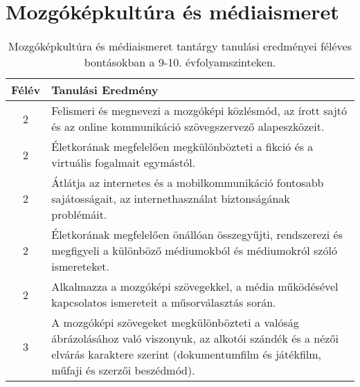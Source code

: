         \section{Mozgóképkultúra és médiaismeret}

       
           \begin{longtable}{c | p{} }
            \caption[Mozgóképkultúra és médiaismeret 9-10.]{Mozgóképkultúra és médiaismeret tantárgy tanulási eredményei féléves bontásokban a 9-10. évfolyamszinteken. }  \\

            \textbf{Félév} & \textbf{Tanulási Eredmény} \\
            \hline
            \endhead
                                
                                          2 &  Felismeri és megnevezi a mozgóképi közlésmód, az írott sajtó és az online kommunikáció szövegszervező alapeszközeit. \\ \hline
                                          2 &  Életkorának megfelelően megkülönbözteti a fikció és a virtuális fogalmait egymástól.  \\ \hline
                                          2 &  Átlátja az internetes és a mobilkommunikáció fontosabb sajátosságait, az internethasználat biztonságának problémáit. \\ \hline
                                          2 &  Életkorának megfelelően önállóan összegyűjti, rendszerezi és megfigyeli a különböző  médiumokból és médiumokról szóló ismereteket. \\ \hline
                                          2 &  Alkalmazza a mozgóképi szövegekkel, a média működésével kapcsolatos ismereteit a műsorválasztás során.  \\ \hline
                                      
                                
                                          3 &  A mozgóképi szövegeket megkülönbözteti a valóság ábrázolásához való viszonyuk, az alkotói szándék és a nézői elvárás karaktere szerint (dokumentumfilm és játékfilm, műfaji és szerzői beszédmód). \\ \hline
                                      

\end{longtable}
